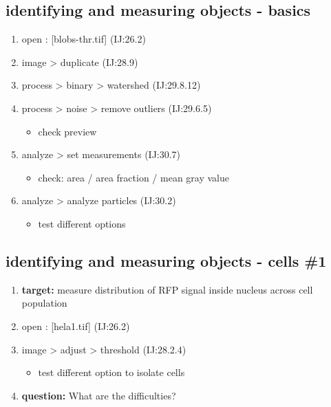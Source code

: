 \documentclass[11pt]{article}
\begin{document}
\subsection{identifying and measuring objects - basics}
\label{sec-6-1}
\begin{enumerate}
\item open : [blobs-thr.tif] (IJ:26.2)
\item image > duplicate (IJ:28.9)
\item process > binary > watershed (IJ:29.8.12)
\item process > noise > remove outliers (IJ:29.6.5)
\begin{itemize}
\item check preview
\end{itemize}
\item analyze > set measurements (IJ:30.7)
\begin{itemize}
\item check: area / area fraction / mean gray value
\end{itemize}
\item analyze > analyze particles  (IJ:30.2)
\begin{itemize}
\item test different options
\end{itemize}
\end{enumerate}

\subsection{identifying and measuring objects - cells \#1}
\label{sec-6-2}
\begin{enumerate}
\item \textbf{target:} measure distribution of RFP signal inside nucleus across cell population
\item open : [hela1.tif] (IJ:26.2)
\item image > adjust > threshold (IJ:28.2.4)
\begin{itemize}
\item test different option to isolate cells
\end{itemize}
\item \textbf{question:} What are the difficulties?
\end{enumerate}
\end{document}
